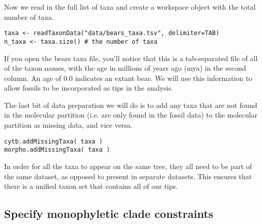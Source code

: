 Now we read in the full list of taxa and create a workspace object with the total number of taxa. 

{\tt \begin{snugshade*}
\begin{lstlisting}
taxa <- readTaxonData("data/bears_taxa.tsv", delimiter=TAB)
n_taxa <- taxa.size() # the number of taxa
\end{lstlisting}
\end{snugshade*}}

If you open the bears taxa file, you'll notice that this is a tab-separated file of all of the taxon names, with the age in millions of years ago (mya) in the second column. An age of 0.0 indicates an extant bear. We will use this information to allow fossils to be incorporated as tips in the analysis. \par

The last bit of data preparation we will do is to add any taxa that are not found in the molecular partition (i.e. are only found in the fossil data) to the molecular partition as missing data, and vice versa.

{\tt \begin{snugshade*}
\begin{lstlisting}
cytb.addMissingTaxa( taxa )
morpho.addMissingTaxa( taxa )
\end{lstlisting}
\end{snugshade*}}

In order for all the taxa to appear on the same tree, they all need to be part of the same dataset, as opposed to present in separate datasets. This ensures that there is a unified taxon set that contains all of our tips.

\bigskip

\subsection{Specify monophyletic clade constraints}





%
%

